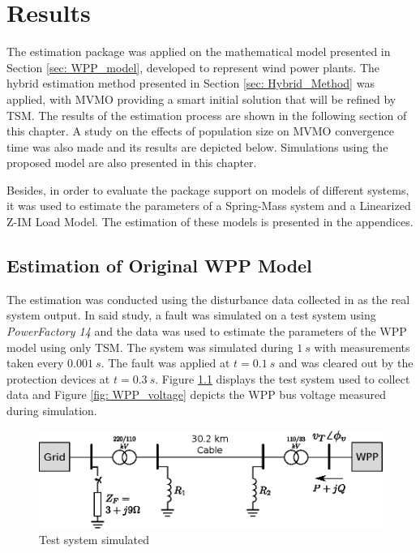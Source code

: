 \chapter{Results}
\label{ch: Results}

The estimation package was applied on the mathematical model presented in Section \ref{sec: WPP_model}, developed to represent wind power plants. The hybrid estimation method presented in Section \ref{sec: Hybrid_Method} was applied, with MVMO providing a smart initial solution that will be refined by TSM. The results of the estimation process are shown in the following section of this chapter. A study on the effects of population size on MVMO convergence time was also made and its results are depicted below. Simulations using the proposed model are also presented in this chapter.

Besides, in order to evaluate the package support on models of different systems, it was used to estimate the parameters of a Spring-Mass system and a Linearized Z-IM Load Model. The estimation of these models is presented in the appendices.

\section{Estimation of Original WPP Model}

The estimation was conducted using the disturbance data collected in \cite{Cari2015} as the real system output. In said study, a fault was simulated on a test system using \textit{PowerFactory 14} and the data was used to estimate the parameters of the WPP model using only TSM. The system was simulated during $1\ s$ with measurements taken every $0.001\ s$. The fault was applied at $t=0.1\ s$ and was cleared out by the protection devices at $t=0.3\ s$. Figure \ref{fig: test_system} displays the test system used to collect data and Figure \ref{fig: WPP_voltage} depicts the WPP bus voltage measured during simulation.

\begin{figure}[!h]
	\caption{Test system simulated}
	\begin{center}
		\includegraphics[scale=1]{Images/Cari_test_system.eps}
	\end{center}
	\label{fig: test_system}
\end{figure}

